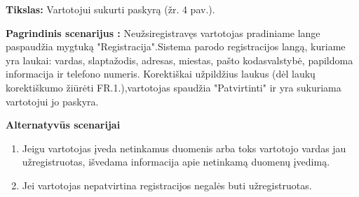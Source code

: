 \documentclass{VUMIFPSkursinis}
\begin{document}

	\textbf{Tikslas:} Vartotojui sukurti paskyrą (žr. 4 pav.).
    
	\textbf{Pagrindinis scenarijus :} Neužsiregistravęs vartotojas pradiniame lange paspaudžia mygtuką "Registracija".Sistema parodo registracijos langą, kuriame yra laukai: vardas, slaptažodis, adresas, miestas, pašto kodasvalstybė, papildoma informacija ir telefono numeris. Korektiškai užpildžius laukus (dėl laukų korektiškumo žiūrėti FR.1.),vartotojas spaudžia "Patvirtinti" ir yra sukuriama vartotojui jo paskyra.

	\textbf{Alternatyvūs scenarijai }
    	\begin{enumerate}
    	\item Jeigu vartotojas įveda netinkamus duomenis arba toks vartotojo vardas
			  jau užregistruotas, išvedama informacija apie netinkamą duomenų įvedimą.
        \item Jei vartotojas nepatvirtina registracijos negalės buti užregistruotas.
        
    	\end{enumerate}
\end{document}
